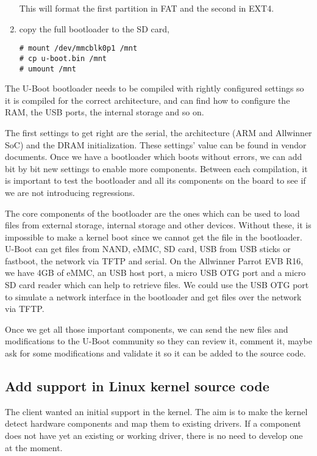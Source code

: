 \begin{enumerate}
This will format the first partition in FAT and the second in EXT4.

  \item copy the full bootloader to the SD card,

\begin{verbatim}
# mount /dev/mmcblk0p1 /mnt
# cp u-boot.bin /mnt
# umount /mnt
\end{verbatim}
\end{enumerate}

The U-Boot bootloader needs to be compiled with rightly configured settings so it is compiled for the correct architecture, and can find how to configure the RAM, the USB ports, the internal storage and so on.

The first settings to get right are the serial, the architecture (ARM and Allwinner SoC) and the DRAM initialization. These settings' value can be found in vendor documents. Once we have a bootloader which boots without errors, we can add bit by bit new settings to enable more components. Between each compilation, it is important to test the bootloader and all its components on the board to see if we are not introducing regressions.

The core components of the bootloader are the ones which can be used to load files from external storage, internal storage and other devices. Without these, it is impossible to make a kernel boot since we cannot get the file in the bootloader. U-Boot can get files from NAND, eMMC, SD card, USB from USB sticks or fastboot, the network via TFTP and serial. On the Allwinner Parrot EVB R16, we have 4GB of eMMC, an USB host port, a micro USB OTG port and a micro SD card reader which can help to retrieve files. We could use the USB OTG port to simulate a network interface in the bootloader and get files over the network via TFTP.

Once we get all those important components, we can send the new files and modifications to the U-Boot community so they can review it, comment it, maybe ask for some modifications and validate it so it can be added to the source code.

\subsection{Add support in Linux kernel source code}

The client wanted an initial support in the kernel. The aim is to make the kernel detect hardware components and map them to existing drivers. If a component does not have yet an existing or working driver, there is no need to develop one at the moment.

